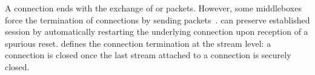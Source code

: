 A \tcp connection ends with the exchange of \fin or \rst packets. However, some
middleboxes force the termination of \tcp connections by sending \rst
packets~\cite{rfc3360,weaver2009detecting}. \tcpls can preserve established
session by automatically restarting the underlying \tcp connection upon
reception of a spurious reset. \tcpls defines the connection termination at the
stream level: a \tcp connection is closed once the last stream attached to a
\tcp connection is securely closed.

